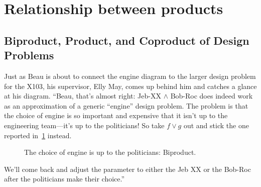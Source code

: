 \section{Relationship between products}
\subsection{Biproduct, Product, and Coproduct of Design Problems}
\begin{example}
Just as Beau is about to connect the engine diagram to the larger design problem for the X103, his supervisor, Elly May, comes up behind him and catches a glance at his diagram. ``Beau, that's almost right: Jeb-XX $\wedge$ Bob-Roc does indeed work as an approximation of a generic ``engine'' design problem. The problem is that the choice of engine is so important and expensive that it isn't up to the engineering team---it's up to the politicians! So take $f \vee g$ out and stick the one reported in~\cref{fig:exbiproduct} instead.
\begin{figure}[h!]
\begin{center}
\end{center}
\caption{The choice of engine is up to the politicians: Biproduct. \label{fig:exbiproduct}}
\end{figure}

We'll come back and adjust the parameter to either the Jeb XX or the Bob-Roc after the politicians make their choice.''
\end{example}
